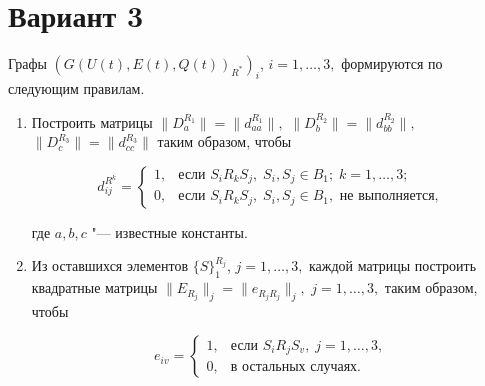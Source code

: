 \documentclass{article}
\begin{document}
\section*{Вариант 3}

Графы $(G(U(t), E(t), Q(t))_{R^*})_i$, $i = 1, \dots, 3,$ формируются по следующим правилам.

\begin{enumerate}

\item Построить матрицы 
$\|D_a^{R_1}\| = \|d_{aa}^{R_1}\|,$ 
$\|D_b^{R_2}\| = \|d_{bb}^{R_2}\|,$ 
$\|D_c^{R_3}\| = \|d_{cc}^{R_3}\|$ 
таким образом, чтобы

\begin{equation}
d_{ij}^{R^k} =
\begin{cases}
1, & \text{если } S_i R_k S_j,\; S_i, S_j \in B_1;\; k = 1, \dots, 3; \\
0, & \text{если } S_i R_k S_j,\; S_i, S_j \in B_1, \text{ не выполняется},
\end{cases}
\end{equation}

где $a, b, c$ "--- известные константы.

\item Из оставшихся элементов $\{S\}_1^{R_j}$, $j = 1, \dots, 3,$
каждой матрицы построить квадратные матрицы 
$\|E_{R_j}\|_j = \|e_{R_j R_j}\|_j,$ $j = 1, \dots, 3,$ таким образом, чтобы

\begin{equation}
e_{iv} =
\begin{cases}
1, & \text{если } S_i R_j S_v,\; j = 1, \dots, 3, \\
0, & \text{в остальных случаях}.
\end{cases}
\end{equation}

\end{enumerate}
\end{document}
